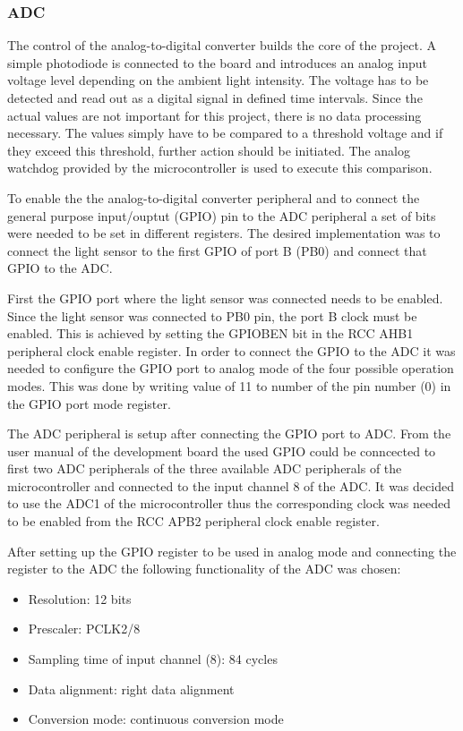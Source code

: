 \subsubsection{ADC}
The control of the analog-to-digital converter builds the core of the project. A simple photodiode is connected to the board and introduces an analog input voltage level depending on the ambient light intensity. The voltage has to be detected and read out as a digital signal in defined time intervals. Since the actual values are not important for this project, there is no data processing necessary. The values simply have to be compared to a threshold voltage and if they exceed this threshold, further action should be initiated. The analog watchdog provided by the microcontroller is used to execute this comparison.\\
\par
To enable the the analog-to-digital converter peripheral and to connect the general purpose input/ouptut (GPIO) pin to the ADC peripheral a set of bits were needed to be set in different registers. The desired implementation was to connect the light sensor to the first GPIO of port B (PB0) and connect that GPIO to the ADC.\\
\par
First the GPIO port where the light sensor was connected needs to be enabled. Since the light sensor was connected to PB0 pin, the port B clock must be enabled. This is achieved by setting the GPIOBEN bit in the RCC AHB1 peripheral clock enable register. In order to connect the GPIO to the ADC it was needed to configure the GPIO port to analog mode of the four possible operation modes. This was done by writing value of 11 to number of the pin number (0) in the GPIO port mode register.\\
\par
The ADC peripheral is setup after connecting the GPIO port to ADC. From the user manual of the development board \cite{UsrManual} the used GPIO could be conncected to first two ADC peripherals of the three available ADC peripherals of the microcontroller and connected to the input channel 8 of the ADC. It was decided to use the ADC1 of the microcontroller thus the corresponding clock was needed to be enabled from the RCC APB2 peripheral clock enable register.\\
\par
After setting up the GPIO register to be used in analog mode and connecting the register to the ADC the following functionality of the ADC was chosen:
\begin{itemize}
  \item Resolution: 12 bits
  \item Prescaler: PCLK2/8
  \item Sampling time of input channel (8): 84 cycles
  \item Data alignment: right data alignment
  \item Conversion mode: continuous conversion mode
\end{itemize}
